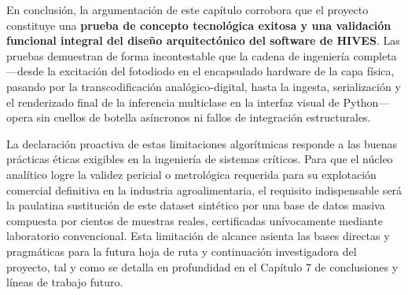 En conclusión, la argumentación de este capítulo corrobora que el proyecto constituye una \textbf{prueba de concepto tecnológica exitosa y una validación funcional integral del diseño arquitectónico del software de HIVES}. Las pruebas demuestran de forma incontestable que la cadena de ingeniería completa —desde la excitación del fotodiodo en el encapsulado hardware de la capa física, pasando por la transcodificación analógico-digital, hasta la ingesta, serialización y el renderizado final de la inferencia multiclase en la interfaz visual de Python— opera sin cuellos de botella asíncronos ni fallos de integración estructurales. 

La declaración proactiva de estas limitaciones algorítmicas responde a las buenas prácticas éticas exigibles en la ingeniería de sistemas críticos. Para que el núcleo analítico logre la validez pericial o metrológica requerida para su explotación comercial definitiva en la industria agroalimentaria, el requisito indispensable será la paulatina sustitución de este dataset sintético por una base de datos masiva compuesta por cientos de muestras reales, certificadas unívocamente mediante laboratorio convencional. Esta limitación de alcance asienta las bases directas y pragmáticas para la futura hoja de ruta y continuación investigadora del proyecto, tal y como se detalla en profundidad en el Capítulo 7 de conclusiones y líneas de trabajo futuro.